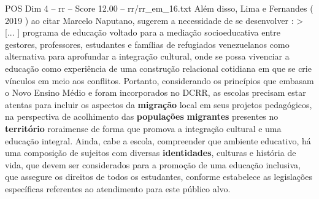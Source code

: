 \begin{textsample}{POS Dim 4 – rr – Score 12.00 – rr/rr\_em\_16.txt}
Além disso, Lima e Fernandes ( 2019 ) ao citar Marcelo Naputano, sugerem a necessidade de se desenvolver : > [... ] programa de educação voltado para a mediação socioeducativa entre gestores, professores, estudantes e famílias de refugiados venezuelanos como alternativa para aprofundar a integração cultural, onde se possa vivenciar a educação como experiência de uma construção relacional cotidiana em que se crie vínculos em meio aos conflitos.
Portanto, considerando os princípios que embasam o Novo Ensino Médio e foram incorporados no DCRR, as escolas precisam estar atentas para incluir os aspectos da \textbf{migração} local em seus projetos pedagógicos, na perspectiva de acolhimento das \textbf{populações} \textbf{migrantes} presentes no \textbf{território} roraimense de forma que promova a integração cultural e uma educação integral.
Ainda, cabe a escola, compreender que ambiente educativo, há uma composição de sujeitos com diversas \textbf{identidades}, culturas e história de vida, que devem ser considerados para a promoção de uma educação inclusiva, que assegure os direitos de todos os estudantes, conforme estabelece as legislações específicas referentes ao atendimento para este público alvo.

\end{textsample}
